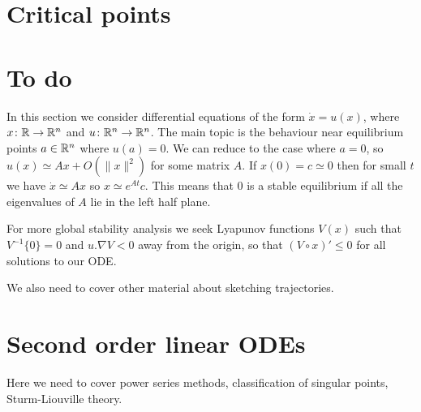 \documentclass[reqno]{amsart}
\theoremstyle{definition}
\begin{document}
\section{Critical points}

\section*{To do}

In this section we consider differential equations of the form
$\dot{x}=u(x)$, where $x\colon{\mathbb{R}}\to{\mathbb{R}}^n$ and $u\colon{\mathbb{R}}^n\to{\mathbb{R}}^n$.  The main
topic is the behaviour near equilibrium points $a\in{\mathbb{R}}^n$ where
$u(a)=0$.  We can reduce to the case where $a=0$, so 
$u(x)\simeq Ax+O(\|x\|^2)$ for some matrix $A$.  If $x(0)=c\simeq 0$
then for small $t$ we have $\dot{x}\simeq Ax$ so $x\simeq e^{At}c$.
This means that $0$ is a stable equilibrium if all the eigenvalues of
$A$ lie in the left half plane.

For more global stability analysis we seek Lyapunov functions $V(x)$
such that $V^{-1}\{0\}=0$ and $u.\nabla V<0$ away from the origin, so
that $(V\circ x)'\leq 0$ for all solutions to our ODE.

We also need to cover other material about sketching trajectories.

\section{Second order linear ODEs}

Here we need to cover power series methods, classification of singular
points, Sturm-Liouville theory.
\end{document}
